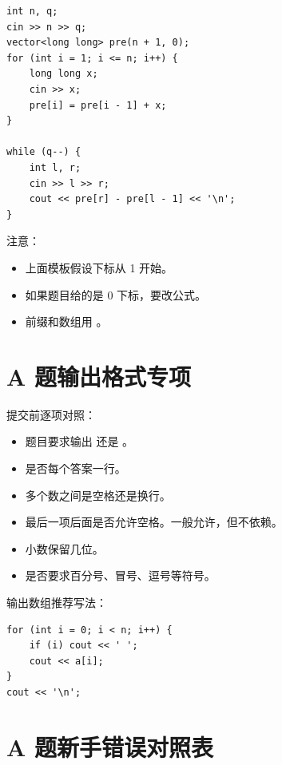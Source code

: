 \begin{lstlisting}
int n, q;
cin >> n >> q;
vector<long long> pre(n + 1, 0);
for (int i = 1; i <= n; i++) {
    long long x;
    cin >> x;
    pre[i] = pre[i - 1] + x;
}

while (q--) {
    int l, r;
    cin >> l >> r;
    cout << pre[r] - pre[l - 1] << '\n';
}
\end{lstlisting}

注意：

\begin{itemize}
  \item 上面模板假设下标从 1 开始。
  \item 如果题目给的是 0 下标，要改公式。
  \item 前缀和数组用 。
\end{itemize}

\section{A 题输出格式专项}\label{sec:05-20}

提交前逐项对照：

\begin{itemize}
  \item 题目要求输出  还是 。
  \item 是否每个答案一行。
  \item 多个数之间是空格还是换行。
  \item 最后一项后面是否允许空格。一般允许，但不依赖。
  \item 小数保留几位。
  \item 是否要求百分号、冒号、逗号等符号。
\end{itemize}

输出数组推荐写法：

\begin{lstlisting}
for (int i = 0; i < n; i++) {
    if (i) cout << ' ';
    cout << a[i];
}
cout << '\n';
\end{lstlisting}

\section{A 题新手错误对照表}\label{sec:05-21}

